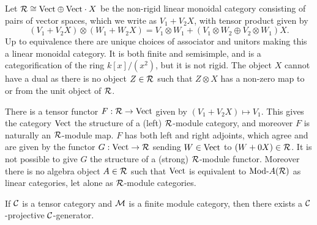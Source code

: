 \documentclass{amsart}
\begin{document}
\begin{example} \label{ex:lax-module}
	Let $\mathcal R \cong \mathrm{Vect} \oplus \mathrm{Vect} \cdot X$ be the non-rigid linear monoidal category consisting of pairs of vector spaces, which we write as $V_1 + V_2 X$, with tensor product given by 
	\begin{equation*}
		(V_1 + V_2 X) \otimes (W_1 + W_2 X) = V_1 \otimes W_1  +  (V_1 \otimes W_2 \oplus V_2 \otimes W_1)X.
	\end{equation*} 
	Up to equivalence there are unique choices of associator and unitors making this a linear monoidal category. 
It is both finite and semisimple, and is a categorification of the ring $k[x]/(x^2)$, but it is not rigid. The object $X$ cannot have a dual as there is no object $Z \in \mathcal R$ such that $Z \otimes X$ has a non-zero map to or from the unit object of $\mathcal R$. 
	
	There is a tensor functor $F:\mathcal R \to \mathrm{Vect}$ given by $(V_1 + V_2 X) \mapsto V_1$. This gives the category $\mathrm{Vect}$ the structure of a (left) $\mathcal R$-module category, and moreover $F$ is naturally an $\mathcal R$-module map. $F$ has both left and right adjoints, which agree and are given by the functor $G: \mathrm{Vect} \to \mathcal R$ sending $W \in \mathrm{Vect}$ to $(W + 0 X) \in \mathcal R$. It is not possible to give $G$ the structure of a (strong) $\mathcal R$-module functor. Moreover there is no algebra object $A \in \mathcal R$ such that $\mathrm{Vect}$ is equivalent to $\Mod{}{A}(\cR)$ as linear categories, let alone as $\mathcal R$-module categories. 
\end{example}



\begin{lemma} \label{lma:Enough_C-projs}
	If $\mathcal C$ is a tensor category and $\mathcal M$ is a finite module category, then there exists a $\mathcal C$-projective $\mathcal C$-generator. 
\end{lemma}
\end{document}
